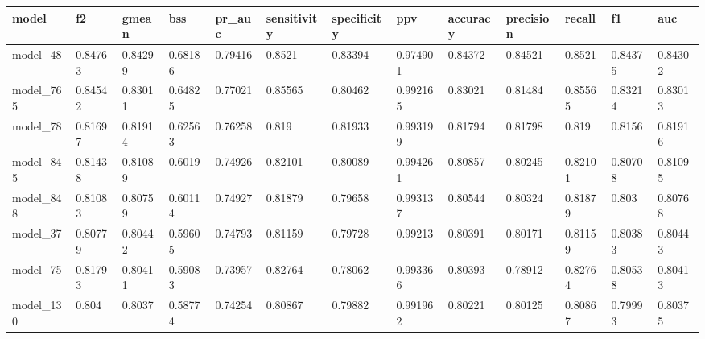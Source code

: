 \begin{tabular}{|l|l|l|l|l|l|l|l|l|l|l|l|l|}
\hline
\textbf{model} & \textbf{f2} & \textbf{gmean} & \textbf{bss} & \textbf{pr\_auc} & \textbf{sensitivity} & \textbf{specificity} & \textbf{ppv} & \textbf{accuracy} & \textbf{precision} & \textbf{recall} & \textbf{f1} & \textbf{auc} \\ \hline
model\_48      & 0.84763     & 0.84299        & 0.68186      & 0.79416          & 0.8521               & 0.83394              & 0.974901     & 0.84372           & 0.84521            & 0.8521          & 0.84375     & 0.84302      \\ \hline
model\_765     & 0.84542     & 0.83011        & 0.64825      & 0.77021          & 0.85565              & 0.80462              & 0.992165     & 0.83021           & 0.81484            & 0.85565         & 0.83214     & 0.83013      \\ \hline
model\_78      & 0.81697     & 0.81914        & 0.62563      & 0.76258          & 0.819                & 0.81933              & 0.993199     & 0.81794           & 0.81798            & 0.819           & 0.8156      & 0.81916      \\ \hline
model\_845     & 0.81438     & 0.81089        & 0.6019       & 0.74926          & 0.82101              & 0.80089              & 0.994261     & 0.80857           & 0.80245            & 0.82101         & 0.80708     & 0.81095      \\ \hline
model\_848     & 0.81083     & 0.80759        & 0.60114      & 0.74927          & 0.81879              & 0.79658              & 0.993137     & 0.80544           & 0.80324            & 0.81879         & 0.803       & 0.80768      \\ \hline
model\_37      & 0.80779     & 0.80442        & 0.59605      & 0.74793          & 0.81159              & 0.79728              & 0.99213      & 0.80391           & 0.80171            & 0.81159         & 0.80383     & 0.80443      \\ \hline
model\_75      & 0.81793     & 0.80411        & 0.59083      & 0.73957          & 0.82764              & 0.78062              & 0.993366     & 0.80393           & 0.78912            & 0.82764         & 0.80538     & 0.80413      \\ \hline
model\_130     & 0.804       & 0.8037         & 0.58774      & 0.74254          & 0.80867              & 0.79882              & 0.991962     & 0.80221           & 0.80125            & 0.80867         & 0.79993     & 0.80375      \\ \hline

\end{tabular}
